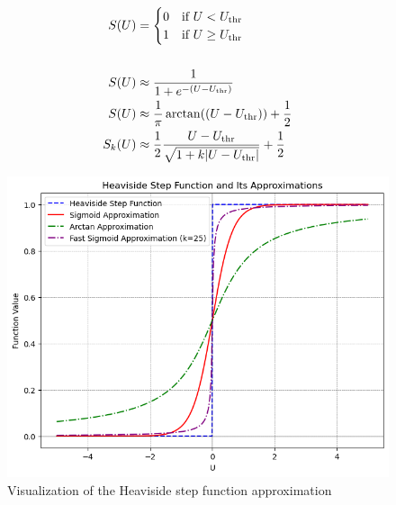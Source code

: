 \documentclass[11pt]{article}
\begin{document}
\begin{figure}[H]
  \begin{minipage}[t]{0.5\textwidth}
    \vspace{40pt} %
    $$\begin{aligned}
        S(U)   & = \begin{cases}
                     0 & \text{if } U < U_{\rm thr}    \\
                     1 & \text{if } U \geq U_{\rm thr}
                   \end{cases}                                                                  \\ \\
        S(U)   & \approx \frac{1}{1 + e^{-(U - U_{\rm thr})}}                                                         \\
        S(U)   & \approx \frac{1}{\pi} \arctan((U - U_{\rm thr})) + \frac{1}{2}                                       \\
        S_k(U) & \approx \frac{1}{2} \frac{U - U_{\rm thr}}{\sqrt{1 + k \lvert U - U_{\rm thr} \rvert}} + \frac{1}{2}
      \end{aligned}$$
  \end{minipage}
  \hfill
  \begin{minipage}[t]{0.45\textwidth}
    \vspace{0pt} %
    \centering
    \includegraphics[width=\textwidth]{./image/approx_surrogate.png}
    \caption{Visualization of the Heaviside step function approximation\cite{LIAO2023126470}}
    \label{fig:approx_surrogate}
  \end{minipage}
\end{figure}
\end{document}
